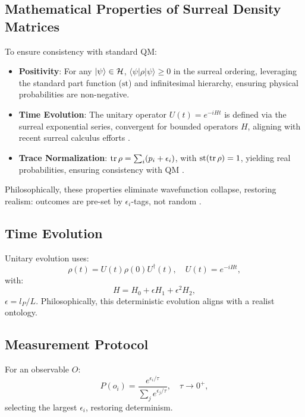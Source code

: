 \documentclass{article}
\begin{document}
\subsection{Mathematical Properties of Surreal Density Matrices}
To ensure consistency with standard QM:
\begin{itemize}
    \item \textbf{Positivity}: For any \(\ket{\psi} \in \mathcal{H}\), \(\langle \psi | \rho | \psi \rangle \geq 0\) in the surreal ordering, leveraging the standard part function (\(\text{st}\)) and infinitesimal hierarchy, ensuring physical probabilities are non-negative.
    \item \textbf{Time Evolution}: The unitary operator \(U(t) = e^{-i H t}\) is defined via the surreal exponential series, convergent for bounded operators \(H\), aligning with recent surreal calculus efforts \cite{Ehrlich2012}.
    \item \textbf{Trace Normalization}: \(\tr \rho = \sum_i (p_i + \epsilon_i)\), with \(\text{st}(\tr \rho) = 1\), yielding real probabilities, ensuring consistency with QM \cite{Goldblatt1998}.
\end{itemize}

Philosophically, these properties eliminate wavefunction collapse, restoring realism: outcomes are pre-set by \(\epsilon_i\)-tags, not random \cite{tHooft2014}.

\subsection{Time Evolution}
Unitary evolution uses:
\begin{equation}
\rho(t) = U(t) \rho(0) U^\dagger(t), \quad U(t) = e^{-i H t},
\end{equation}
with:
\begin{equation}
H = H_0 + \epsilon H_1 + \epsilon^2 H_2,
\end{equation}
\(\epsilon = l_P / L\). Philosophically, this deterministic evolution aligns with a realist ontology.

\subsection{Measurement Protocol}
For an observable \(O\):
\begin{equation}
P(o_i) = \frac{e^{\epsilon_i / \tau}}{\sum_j e^{\epsilon_j / \tau}}, \quad \tau \to 0^+,
\end{equation}
selecting the largest \(\epsilon_i\), restoring determinism.
\end{document}
